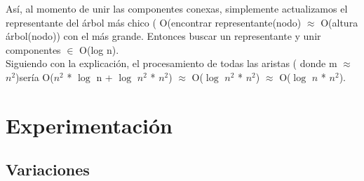 \documentclass[11pt,a4paper]{article}
\begin{document}
Así, al momento de unir las componentes conexas, simplemente actualizamos el representante del árbol más chico ( O(encontrar representante(nodo) $\approx$ O(altura árbol(nodo)) con el más grande. Entonces buscar un representante y unir componentes $\in$ O(log n).
\\Siguiendo con la explicación, el procesamiento de todas las aristas ( donde m $\approx$ $n^{2}$)sería O($n^2$ * $\log$ n + $\log$ $n^{2}$ * $n^{2}$) $\approx$ O($\log$ $n^{2}$ * $n^{2}$) $\approx$ O($\log$ $n$ * $n^{2}$).

\section{Experimentación}
\subsection{Variaciones}
\end{document}
